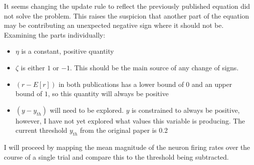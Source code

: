 \documentclass[11pt]{article}
\providecommand{\tightlist}{%
      \setlength{\itemsep}{0pt}\setlength{\parskip}{0pt}}
\begin{document}
It seems changing the update rule to reflect the previously published
equation did not solve the problem. This raises the suspicion that
another part of the equation may be contributing an unexpected negative
sign where it should not be. Examining the parts individually:

\begin{itemize}
\tightlist
\item
  \(\eta\) is a constant, positive quantity
\item
  \(\zeta\) is either \(1\) or \(-1\). This should be the main source of
  any change of signs.
\item
  \((r - E[r])\) in both publications has a lower bound of \(0\) and an
  upper bound of \(1\), so this quantity will always be positive
\item
  \((y - y_{th})\) will need to be explored. \(y\) is constrained to
  always be positive, however, I have not yet explored what values this
  variable is producing. The current threshold \(y_{th}\) from the
  original paper is 0.2
\end{itemize}

I will proceed by mapping the mean magnitude of the neuron firing rates
over the course of a single trial and compare this to the threshold
being subtracted.
\end{document}
